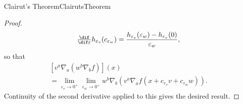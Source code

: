 \begin{thm}{Clairut's Theorem}{ClairutsTheorem}
\begin{proof}
\begin{equation}
\tfrac{\dif}{\dif \varepsilon}h_{\varepsilon _v}(c_{\varepsilon _w})=\frac{h_{\varepsilon _v}(\varepsilon _w)-h_{\varepsilon _v}(0)}{\varepsilon _w}, 
\end{equation}
so that
\begin{equation}
\begin{multlined}
\left[ v^a\nabla _a(w^b\nabla _bf)\right] (x) \\ =\lim _{\varepsilon _v\to 0^+}\lim _{\varepsilon _w\to 0^+}w^b\nabla _b\left( v^a\nabla _af(x+c_{\varepsilon _v}v+c_{\varepsilon _w}w)\right) .
\end{multlined}
\end{equation}
Continuity of the second derivative applied to this gives the desired result.
\end{proof}
\end{thm}
